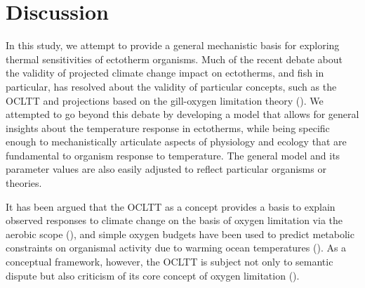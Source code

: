 \documentclass[11pt]{article}\usepackage[]{graphicx}\usepackage[]{color}
\begin{document}
\section*{Discussion}

In this study, we attempt to provide a general mechanistic basis for exploring thermal sensitivities of ectotherm organisms. Much of the recent debate about the validity of projected climate change impact on ectotherms, and fish in particular, has resolved about the validity of particular concepts, such as the OCLTT and projections based on the gill-oxygen limitation theory (\cite{pauly_sound_2017,lefevre_modelling_2017}). We attempted to go beyond this debate by developing a model that allows for general insights about the temperature response in ectotherms, while being specific enough to mechanistically articulate aspects of physiology and ecology that are fundamental to organism response to temperature. The general model and its parameter values are also easily adjusted to reflect particular organisms or theories. 

It has been argued that the OCLTT as a concept provides a basis to explain observed responses to climate change on the basis of oxygen limitation via the aerobic scope (\cite{portner_physiology_2008,portner_oxygen-and_2010}), and simple oxygen budgets have been used to predict metabolic constraints on organismal activity due to warming ocean temperatures (\cite{deutsch_climate_2015}). As a conceptual framework, however, the OCLTT is subject not only to semantic dispute but also criticism of its core concept of oxygen limitation (\cite{jutfelt_oxygen-and_2018,lefevre_are_2016}).
\end{document}
